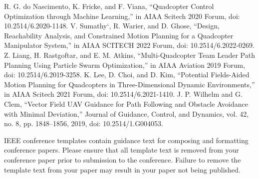 \documentclass[conference]{IEEEtran}
\begin{document}
\begin{thebibliography}{00}
 R. G. do Nascimento, K. Fricke, and F. Viana, “Quadcopter Control Optimization through Machine Learning,” in AIAA Scitech 2020 Forum, doi: 10.2514/6.2020-1148.
 V. Sumathy`, R. Warier, and D. Ghose, “Design, Reachability Analysis, and Constrained Motion Planning for a Quadcopter Manipulator System,” in AIAA SCITECH 2022 Forum, doi: 10.2514/6.2022-0269.
 Z. Liang, H. Rastgoftar, and E. M. Atkins, “Multi-Quadcopter Team Leader Path Planning Using Particle Swarm Optimization,” in AIAA Aviation 2019 Forum, doi: 10.2514/6.2019-3258.
 K. Lee, D. Choi, and D. Kim, “Potential Fields-Aided Motion Planning for Quadcopters in Three-Dimensional Dynamic Environments,” in AIAA Scitech 2021 Forum, doi: 10.2514/6.2021-1410.
 J. P. Wilhelm and G. Clem, “Vector Field UAV Guidance for Path Following and Obstacle Avoidance with Minimal Deviation,” Journal of Guidance, Control, and Dynamics, vol. 42, no. 8, pp. 1848–1856, 2019, doi: 10.2514/1.G004053.


\end{thebibliography}
\vspace{12pt}
\color{red}
IEEE conference templates contain guidance text for composing and formatting conference papers. Please ensure that all template text is removed from your conference paper prior to submission to the conference. Failure to remove the template text from your paper may result in your paper not being published.
\end{document}
